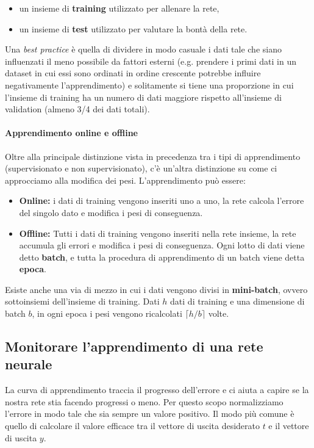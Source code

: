 \documentclass[12pt, twoside, letterpaper]{report}
\begin{document}
			\begin{itemize}
				\item un insieme di \textbf{training} utilizzato per allenare la rete,
				\item un insieme di \textbf{test} utilizzato per valutare la bontà della rete.
			\end{itemize}
			Una \textit{best practice} è quella di dividere in modo casuale i dati tale che siano influenzati il meno possibile da fattori esterni (e.g. prendere i primi dati in un dataset in cui essi sono ordinati in ordine crescente potrebbe influire negativamente l'apprendimento) e solitamente si tiene una proporzione in cui l'insieme di training ha un numero di dati maggiore rispetto all'insieme di validation (almeno 3/4 dei dati totali). 

			\paragraph{Apprendimento online e offline} Oltre alla principale distinzione vista in precedenza tra i tipi di apprendimento (supervisionato e non supervisionato), c'è un'altra distinzione su come ci approcciamo alla modifica dei pesi. L'apprendimento può essere: 
				\begin{itemize}
					\item \textbf{Online:} i dati di training vengono inseriti uno a uno, la rete calcola l'errore del singolo dato e modifica i pesi di conseguenza.
					\item \textbf{Offline:} Tutti i dati di training vengono inseriti nella rete insieme, la rete accumula gli errori e modifica i pesi di conseguenza. Ogni lotto di dati viene detto \textbf{batch}, e tutta la procedura di apprendimento di un batch viene detta \textbf{epoca}.
				\end{itemize}
				Esiste anche una via di mezzo in cui i dati vengono divisi in \textbf{mini-batch}, ovvero sottoinsiemi dell'insieme di training. Dati $h$ dati di training e una dimensione di batch $b$, in ogni epoca i pesi vengono ricalcolati $\lceil h/b \rceil$ volte.
			
			\subsection{Monitorare l'apprendimento di una rete neurale}
				La curva di apprendimento traccia il progresso dell'errore e ci aiuta a capire se la nostra rete stia facendo progressi o meno. Per questo scopo normalizziamo l'errore in modo tale che sia sempre un valore positivo. Il modo più comune è quello di calcolare il valore efficace tra il vettore di uscita desiderato $t$ e il vettore di uscita $y$. 
\end{document}
